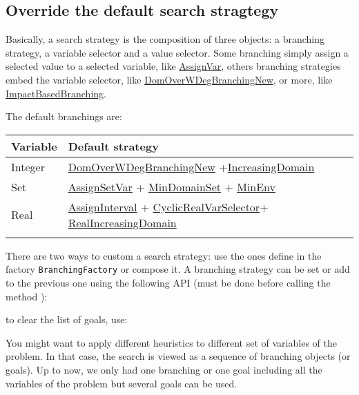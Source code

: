 \subsection{Override the default search stragtegy}\label{solver:overridethedefaultsearchstrategy}\hypertarget{solver:overridethedefaultsearchstrategy}{}


Basically, a search strategy is the composition of three objects: a branching strategy, a variable selector and a value selector. Some branching simply assign a selected value to a selected variable, like \hyperlink{assignvar:assignvarbranchstrat}{AssignVar}, others branching strategies embed the variable selector, like \hyperlink{domoverwdeg:domoverwdegbranchstrat}{DomOverWDegBranchingNew}, or more, like  \hyperlink{impact:impactbranchstrat}{ImpactBasedBranching}.

The default branchings are: 

\noindent\begin{tabular}{p{.4\linewidth}p{.6\linewidth}}
\hline
Variable &  Default strategy \\
\hline
Integer & \hyperlink{domoverwdeg:domoverwdegbranchstrat}{DomOverWDegBranchingNew} +\hyperlink{increasingdomain:increasingdomainvaliterator}{IncreasingDomain}\\
Set &   \hyperlink{assignsetvar:assignsetvarbranchstrat}{AssignSetVar} + \hyperlink{mindomset:mindomsetvarselector}{MinDomainSet} + \hyperlink{minenv:minenvvalselector}{MinEnv} \\
 Real &  \hyperlink{assigninterval:assignintervalbranchstrat}{AssignInterval} + \hyperlink{cyclicrealvarselector:cyclicrealvarselectorvarselector}{CyclicRealVarSelector}+ \hyperlink{realincreasingdomain:realincreasingdomainvaliterator}{RealIncreasingDomain} \\
\hline\\
\end{tabular}

There are two ways to custom a search strategy: use the ones define in the factory  \texttt{BranchingFactory} or compose it. 
A branching strategy can be set or add to the previous one using the following API (must be done before calling the method ):


\noindent to clear the list of goals, use:


You might want to apply different heuristics to different set of variables of the problem. In that case, the search is viewed as a sequence of branching objects (or goals). Up to now, we only had one branching or one goal including all the variables of the problem but several goals can be used.

